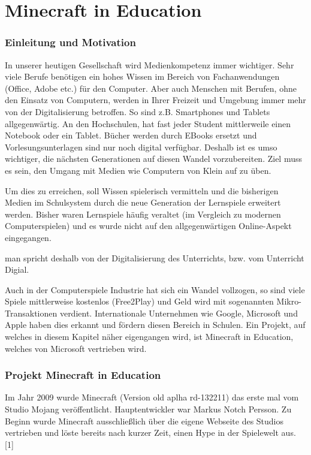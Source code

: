 \chapter{Minecraft in Education}
\subsection{Einleitung und Motivation}
In unserer heutigen Gesellschaft wird Medienkompetenz immer wichtiger. Sehr viele Berufe benötigen ein hohes Wissen im Bereich von Fachanwendungen (Office, Adobe etc.) für den Computer. 
Aber auch Menschen mit Berufen, ohne den Einsatz von Computern, werden in Ihrer Freizeit und Umgebung immer mehr von der Digitalisierung betroffen.
So sind z.B. Smartphones und Tablets allgegenwärtig. An den Hochschulen, hat fast jeder Student mittlerweile einen Notebook oder ein Tablet.
Bücher werden durch EBooks ersetzt und Vorlesungsunterlagen sind nur noch digital verfügbar. Deshalb ist es umso wichtiger, die nächsten Generationen auf diesen Wandel vorzubereiten. 
Ziel muss es sein, den Umgang mit Medien wie Computern von Klein auf zu üben.

Um dies zu erreichen, soll Wissen spielerisch vermitteln und die bisherigen Medien im Schulsystem durch die neue Generation der Lernspiele erweitert werden.
Bisher waren Lernspiele häufig veraltet (im Vergleich zu modernen Computerspielen) und es wurde nicht auf den allgegenwärtigen Online-Aspekt eingegangen.

man spricht deshalb von der Digitalisierung des Unterrichts, bzw. vom Unterricht Digial.

Auch in der Computerspiele Industrie hat sich ein Wandel vollzogen, so sind viele Spiele mittlerweise kostenlos (Free2Play)
und Geld wird mit sogenannten Mikro-Transaktionen verdient. 
Internationale Unternehmen wie Google, Microsoft und Apple haben dies erkannt und fördern diesen Bereich in Schulen.
Ein Projekt, auf welches in diesem Kapitel näher eigengangen wird, ist Minecraft in Education, welches von Microsoft vertrieben wird.

\subsection{Projekt Minecraft in Education}

Im Jahr 2009 wurde Minecraft (Version old aplha rd-132211) das erste mal vom
Studio Mojang veröffentlicht. Hauptentwickler war Markus Notch Persson. Zu Beginn wurde Minecraft
ausschließlich über die eigene Webseite des Studios vertrieben und löste bereits nach kurzer Zeit,
einen Hype in der Spielewelt aus. 
[1]

